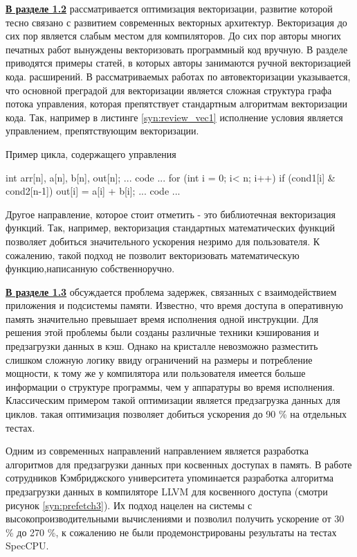 \underline{\textbf{В разделе 1.2}}  рассматривается оптимизация векторизации, развитие которой
тесно связано с развитием современных векторных архитектур. Векторизация до сих пор является слабым местом для компиляторов. До сих пор авторы многих печатных работ вынуждены векторизовать программный код вручную.  В разделе приводятся примеры статей, в которых авторы занимаются ручной векторизацией кода.  
расширений. В рассматриваемых работах по автовекторизации указывается, что основной
преградой для векторизации является сложная структура графа потока управления,
которая препятствует стандартным алгоритмам векторизации кода. Так,
например в листинге \ref{syn:review_vec1} исполнение условия является управлением, препятствующим
векторизации.

\begin{ListingEnv}[!h]
	\captiondelim{ } %
	\caption{Пример цикла, содержащего управления}\label{syn:review_vec1}
	
	\begin{Verb}
	  int arr[n], a[n],  b[n], out[n];
	  ... code ...
	  for (int i = 0; i< n; i++) {
	  	if (cond1[i] & cond2[n-1]){
	  		out[i] = a[i] + b[i];  
	  	}
	  }
	  ... code ...
	\end{Verb}
\end{ListingEnv}

Другое направление, которое стоит отметить - это библиотечная векторизация
функций. Так, например, векторизация стандартных математических
функций  позволяет добиться значительного ускорения незримо для пользователя.
К сожалению, такой подход не позволит векторизовать математическую
функцию,написанную собственноручно.

\underline{\textbf{В разделе 1.3}} обсуждается проблема задержек, связанных с взаимодействием
приложения и подсистемы памяти. Известно, что время доступа в оперативную
память значительно превышает время исполнения одной инструкции.
Для решения этой проблемы были созданы различные техники кэширования и
предзагрузки данных в кэш. Однако на кристалле невозможно разместить
слишком сложную логику ввиду ограничений на размеры и потребление
мощности, к тому же у компилятора или пользователя имеется больше информации
о структуре программы, чем у аппаратуры во время исполнения. Классическим примером такой оптимизации является предзагрузка данных
для циклов. такая оптимизация позволяет добиться ускорения до 90 \%  на отдельных тестах.

Одним из современных направлений направлением является разработка
алгоритмов для предзагрузки данных при косвенных доступах в память. В работе
сотрудников Кэмбриджского университета упоминается разработка
алгоритма предзагрузки данных в компиляторе LLVM для косвенного доступа (смотри рисунок \ref{syn:prefetch3}).
Их подход нацелен на системы с высокопроизводительными вычислениями и
позволил получить ускорение от 30 \% до 270 \%, к сожалению не были продемонстрированы
результаты на тестах SpecCPU. 

